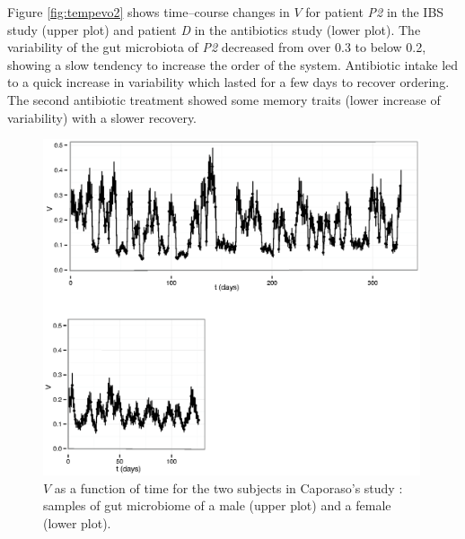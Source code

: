 Figure \ref{fig:tempevo2} shows time--course changes in $V$ for patient \emph{P2} in the IBS study\cite{IBS} (upper plot) and patient \emph{D} in the antibiotics study\cite{antibiotic} (lower plot). The variability of the gut microbiota of \emph{P2} decreased from over 0.3 to below 0.2, showing a slow tendency to increase the order of the system. Antibiotic intake led to a quick increase in variability which lasted for a few days to recover ordering. The second antibiotic treatment showed some memory traits (lower increase of variability) with a slower recovery.

\begin{figure}
	\includegraphics[width=0.99\textwidth]{figs/Fig6.eps}
\caption{$V$ as a function of time for the two subjects in Caporaso's study \cite{moving}: samples of gut microbiome of a male (upper plot) and a female (lower plot).}
\label{fig:tempevo1}
\end{figure}

